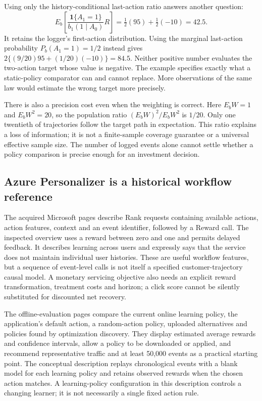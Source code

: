 Using only the history-conditional last-action ratio answers another question:
\[
 E_b\left[\frac{\mathbf1\{A_1=1\}}{b_1(1\mid A_0)}R\right]
 =\tfrac12(95)+\tfrac12(-10)=42.5.
\]
It retains the logger's first-action distribution. Using the marginal
last-action probability $P_b(A_1=1)=1/2$ instead gives
$2\{(9/20)95+(1/20)(-10)\}=84.5$. Neither positive number evaluates the
two-action target whose value is negative. The example specifies exactly
what a static-policy comparator can and cannot replace. More observations
of the same law would estimate the wrong target more precisely.
\citep{exec16_cp_exact}

There is also a precision cost even when the weighting is correct. Here
$E_bW=1$ and $E_bW^2=20$, so the population ratio
$(E_bW)^2/E_bW^2$ is $1/20$. Only one twentieth of trajectories follow
the target path in expectation. This ratio explains a loss of information;
it is not a finite-sample coverage guarantee or a universal effective sample
size. The number of logged events alone cannot settle whether a policy
comparison is precise enough for an investment decision.
\citep{exec16_cp_exact}

\subsection{Azure Personalizer is a historical workflow reference}

The acquired Microsoft pages describe Rank requests containing available
actions, action features, context and an event identifier, followed by a Reward
call. The inspected overview uses a reward between zero and one and permits
delayed feedback. It describes learning across users and expressly says that
the service does not maintain individual user histories. These are useful
workflow features, but a sequence of event-level calls is not itself a
specified customer-trajectory causal model. A monetary servicing objective
also needs an explicit reward transformation, treatment costs and horizon;
a click score cannot be silently substituted for discounted net recovery.
\citep{exec16_cp_azure}

The offline-evaluation pages compare the current online learning policy,
the application's default action, a random-action policy, uploaded alternatives
and policies found by optimization discovery. They display estimated average
rewards and confidence intervals, allow a policy to be downloaded or applied,
and recommend representative traffic and at least 50,000 events as a practical
starting point. The conceptual description replays chronological events with
a blank model for each learning policy and retains observed rewards when the
chosen action matches. A learning-policy configuration in this description
controls a changing learner; it is not necessarily a single fixed action rule.
\citep{exec16_cp_azure}

